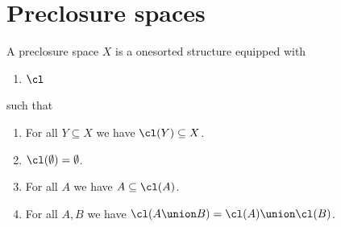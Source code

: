 

\section{Preclosure spaces}

\begin{struct}\label{preclosure}
    A preclosure space $X$ is a onesorted structure equipped with
    \begin{enumerate}
        \item $\cl$
    \end{enumerate}
    such that
    \begin{enumerate}
        \item\label{preclosure_closed} For all $Y\subseteq X$ we have $\cl(Y)\subseteq X$.
        \item\label{preclosure_emptyset} $\cl(\emptyset) = \emptyset$.
        \item\label{preclosure_increasing} For all $A$ we have $A\subseteq \cl(A)$.
        \item\label{preclosure_union_commutes} For all $A, B$ we have $\cl(A\union B) = \cl(A) \union \cl(B)$.
    \end{enumerate}
\end{struct}

